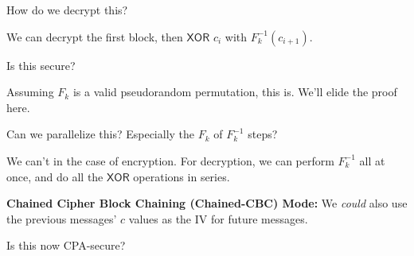 \begin{ques*}
    How do we decrypt this?
\end{ques*}
We can decrypt the first block, then $\mathsf{XOR}$ $c_i$ with $F^{-1}_k(c_{i+1})$.

\begin{ques*}
    Is this secure?
\end{ques*}
Assuming $F_k$ is a valid pseudorandom permutation, this is. We'll elide the proof here.

\begin{ques*}
    Can we parallelize this? Especially the $F_k$ of $F_k^{-1}$ steps?
\end{ques*}
We can't in the case of encryption. For decryption, we can perform $F_k^{-1}$ all at once, and do all the $\mathsf{XOR}$ operations in series.

\textbf{Chained Cipher Block Chaining (Chained-CBC) Mode:}
We \emph{could} also use the previous messages' $c$ values as the IV for future messages.


\begin{ques*}
    Is this now CPA-secure?
\end{ques*}